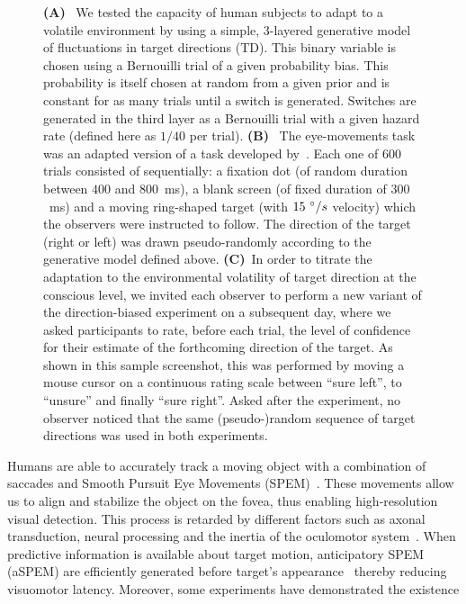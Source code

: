 \documentclass[12pt,english]{article}%
\newcommand{\ms}{\si{\milli\second}}%
\newcommand{\citep}[1]{\parencite{#1}}
\newcommand{\citet}[1]{\textcite{#1}}
\begin{document}
\begin{figure}
{\textbf{(A)}~
We tested the capacity of human subjects to adapt to a volatile environment 
by using a simple, 3-layered generative model of fluctuations in target directions (TD).
This binary variable is chosen using a Bernouilli trial of a given probability bias.
This probability is itself chosen at random from a given prior 
and is constant for as many trials until a switch is generated.
Switches are generated in the third layer as a Bernouilli trial 
with a given hazard rate (defined here as $1/40$ per trial).
\textbf{(B)}~
The eye-movements task was an adapted version of a task developed by~\citet{Montagnini2010}. 
Each one of $600$ trials consisted of sequentially:
a fixation dot (of random duration between $400$ and $800$~\ms),
a blank screen (of fixed duration of  $300$~\ms) and
a moving ring-shaped target (with $15~\degree/s$ velocity) which the observers were instructed to follow.
The direction of the target (right or left) was drawn pseudo-randomly
according to the generative model defined above. 
\textbf{(C)}~In order to titrate the adaptation 
to the environmental volatility of target direction at the conscious level,
we invited each observer to perform a new variant of the direction-biased experiment on a subsequent day,
where we asked participants to rate, before each trial, the level of confidence
for their estimate of the forthcoming direction of the target.
As shown in this sample screenshot,
this was performed by moving a mouse cursor on a continuous rating scale
between ``sure left'', to ``unsure'' and finally ``sure right''.
Asked after the experiment, no observer noticed
that the same (pseudo-)random sequence of target directions was used in both experiments.
}
\label{fig:intro}
\end{figure}
Humans are able to accurately track a moving object
with a combination of saccades and
Smooth Pursuit Eye Movements (SPEM)~\citep{ref}.
These movements allow us to align and
stabilize the object on the fovea,
thus enabling high-resolution visual detection.
This process is retarded by different factors such as axonal transduction,
neural processing and the inertia of the oculomotor system~\citep{Krauzlis89}.
When predictive information is available about target motion,
anticipatory SPEM (aSPEM) are
efficiently generated before target's appearance~\citep{Westheimer1954, Kowler1979a, Kowler1979b} thereby reducing visuomotor latency.
Moreover, some experiments have demonstrated the existence
\end{document}
